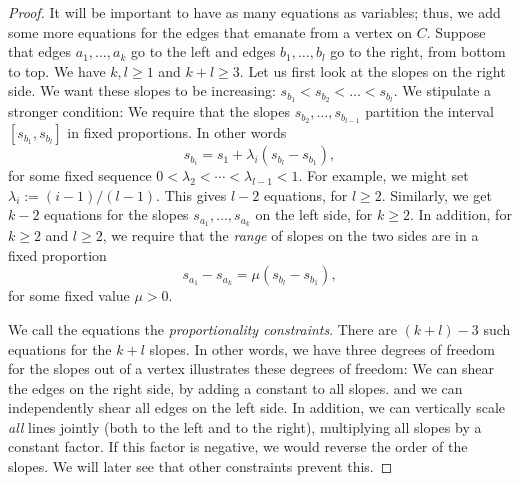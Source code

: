 \begin{proof}
It will be important to have as many equations as variables;
thus, we add some more equations for the edges that emanate from a
vertex on $C$.
Suppose that edges $a_1,\ldots,a_k$ 
go to the left and edges $b_1,\ldots,b_l$ go to the
right, from bottom to top.
We have $k,l\ge1$ and $k+l\ge 3$.
Let us first look at the slopes on the right side.
We want these slopes to be increasing:
$s_{b_1} < s_{b_2} < \dots  <s_{b_l}$. We stipulate a stronger
condition:
We require that the slopes
$s_{b_2}, \dots, s_{b_{l-1}}$ partition the interval
$[s_{b_1},s_{b_l}]$ in fixed proportions. In other words
\begin{equation}
  \label{eq:proportion}
s_{b_i} = s_1 + \lambda_i(s_{b_{l}}-s_{b_1}),
\end{equation}
for some fixed sequence $0<\lambda_2<\cdots<\lambda_{l-1}<1$.
For example, we might set $\lambda_i := (i-1)/(l-1)$.
This gives $l-2$ equations, for $l\ge 2$. Similarly, we get
$k-2$ equations for the slopes
$s_{a_1}, \dots, s_{a_{k}}$ on the left side, for $k\ge 2$.
In addition, for $k\ge 2$ and $l\ge 2$, we require that the \emph{range} of
slopes
on the two sides are in a fixed proportion
\begin{equation}
  \label{eq:proportion2}
s_{a_1}-s_{a_{k}} = \mu (s_{b_{l}}-s_{b_1}),
\end{equation}
for some fixed value $\mu>0$.

We call the equations
\thetag{\ref{eq:proportion}--\ref{eq:proportion2}} the
\emph{proportionality constraints}.
There are $(k+l)-3$ such equations for the $k+l$ slopes. In
other words, we have three degrees of freedom for the slopes out of a vertex
  illustrates these  degrees of freedom:
We can shear the edges on the right side, by adding a constant to all
slopes.
and we can independently shear all edges on the left side.
In addition, we can vertically scale \emph{all} lines jointly (both to
the left and to the right), multiplying all slopes by a constant factor.
If this factor is negative, we would reverse the order of the
slopes. We will later see that other constraints prevent this.



\end{proof}
